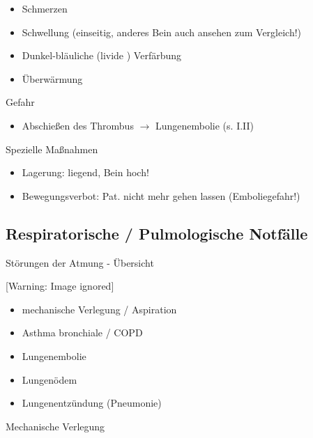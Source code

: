 \documentclass{article}
\begin{document}
\begin{itemize}
\item Schmerzen

\item Schwellung (einseitig, anderes Bein auch ansehen zum Vergleich!)

\item Dunkel-bl\"auliche (livide ) Verf\"arbung

\item \"Uberw\"armung

\end{itemize}
Gefahr

\begin{itemize}
\item Abschie{\ss}en des Thrombus ${\rightarrow}$ Lungenembolie (s.
I.II{\guillemotright}\pageref{bkm:RefHeading37612625})

\end{itemize}
Spezielle Ma{\ss}nahmen

\begin{itemize}
\item Lagerung:  liegend, Bein hoch!

\item Bewegungsverbot: Pat. nicht mehr gehen lassen  (Emboliegefahr!)

\end{itemize}
\subsection[Respiratorische / Pulmologische
\ Notf\"alle]{Respiratorische / Pulmologische  Notf\"alle}
St\"orungen der Atmung - \"Ubersicht

\begin{center}
 [Warning: Image ignored] %

\end{center}
\begin{itemize}
\item mechanische Verlegung / Aspiration

\item Asthma bronchiale  / COPD

\item Lungenembolie

\item Lungen\"odem

\item Lungenentz\"undung (Pneumonie)

\end{itemize}
Mechanische Verlegung
\end{document}
